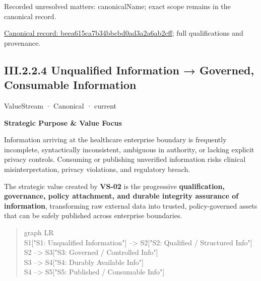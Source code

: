 {\small Recorded unresolved matters: canonicalName; exact scope remains in the canonical record.}\par
{\footnotesize \href{../../../../../../../../continuum/strategy/value-stream/beea615ca7b34bbcbd0ad3a2a6ab2cff.md}{Canonical record: beea615ca7b34bbcbd0ad3a2a6ab2cff}; full qualifications and provenance.}\par
\subsection*{III.2.2.4 Unqualified Information → Governed, Consumable Information}
\label{navigation:III.2.2.4}

\label{element:02e036f18bab400bac261007e39457ee}
{\small ValueStream · Canonical · current}\par

\par\medskip\textbf{Strategic Purpose \& Value Focus}\par


Information arriving at the healthcare enterprise boundary is frequently incomplete, syntactically inconsistent, ambiguous in authority, or lacking explicit privacy controls. Consuming or publishing unverified information risks clinical misinterpretation, privacy violations, and regulatory breach.



The strategic value created by \textbf{VS-02} is the progressive \textbf{qualification, governance, policy attachment, and durable integrity assurance of information}, transforming raw external data into trusted, policy-governed assets that can be safely published across enterprise boundaries.



\begin{quote}\small\ttfamily
graph LR\\
    S1["S1: Unqualified Information"] --> S2["S2: Qualified / Structured Info"]\\
    S2 --> S3["S3: Governed / Controlled Info"]\\
    S3 --> S4["S4: Durably Available Info"]\\
    S4 --> S5["S5: Published / Consumable Info"]\\

\end{quote}


